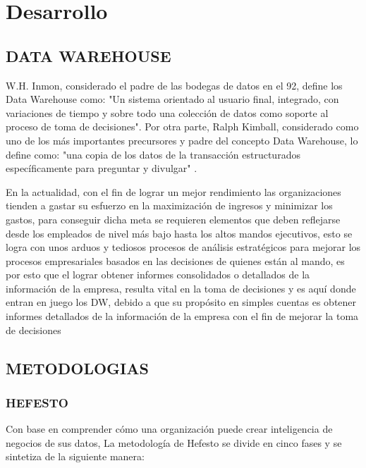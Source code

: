 \documentclass[twoside,twocolumn]{article}
\begin{document}
\begin{center}

\end{center}

\section{Desarrollo}

\subsection{DATA WAREHOUSE}

W.H. Inmon, considerado el padre de las bodegas de datos en el 92, define los Data Warehouse como: "Un sistema orientado al usuario final, integrado, con variaciones de tiempo y sobre todo una colección de datos como soporte al proceso de toma de decisiones". Por otra parte, Ralph Kimball, considerado como uno de los más importantes precursores y padre del concepto Data Warehouse, lo define como: "una copia de los datos de la transacción estructurados específicamente para preguntar y divulgar" . 

En la actualidad, con el fin de lograr un mejor rendimiento las organizaciones tienden a gastar su esfuerzo en la maximización de ingresos y minimizar los gastos, para conseguir dicha meta se requieren elementos que deben reflejarse desde los empleados de nivel más bajo hasta los altos mandos ejecutivos, esto se logra con unos arduos y tediosos procesos de análisis estratégicos para mejorar los procesos empresariales basados en las decisiones de quienes están al mando, es por esto que el lograr obtener informes consolidados o detallados de la información de la empresa, resulta vital en la toma de decisiones y es aquí donde entran en juego los DW, debido a que su propósito en simples cuentas es obtener informes detallados de la información de la empresa con el fin de mejorar la toma de decisiones 

\subsection{METODOLOGIAS}
\subsubsection{HEFESTO}
Con base en comprender cómo una organización puede crear inteligencia de negocios de sus datos, La metodología de Hefesto se divide en cinco fases y se sintetiza de la siguiente manera: 
\end{document}
